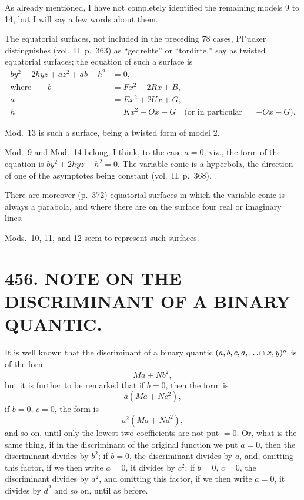 \documentclass[11pt,a4paper]{article}
\newcommand{\article}[2]{\section*{#1. #2}}
\begin{document}
As already mentioned, I have not completely identified the remaining models 9 to 14, but I will say a few words about them.

The equatorial surfaces, not included in the preceding 78 cases, Pl"{u}cker distinguishes (vol.~II. p.~363) as ``gedrehte'' or ``tordirte,'' say as twisted equatorial surfaces; the equation of such a surface is
\begin{align*}
by^{2} + 2hyz + az^{2} + ab - h^{2} &= 0,\\
\text{where}\qquad b &= F x^{2} - 2R x + B,\\
a &= Ex^{2} + 2Ux + G,\\
h &= Kx^{2} - Ox - G \quad \text{(or in particular } = -Ox - G\text{)}.
\end{align*}

Mod.~13 is such a surface, being a twisted form of model 2.

Mod.~9 and Mod.~14 belong, I think, to the case $a=0$; viz., the form of the equation is $by^{2} + 2hyz - h^{2} = 0$. The variable conic is a hyperbola, the direction of one of the asymptotes being constant (vol.~II. p.~368).

There are moreover (p.~372) equatorial surfaces in which the variable conic is always a parabola, and where there are on the surface four real or imaginary lines.

Mods.~10, 11, and 12 seem to represent such surfaces.

\newpage
\setcounter{page}{303}

\article{456}{NOTE ON THE DISCRIMINANT OF A BINARY QUANTIC.}


\vspace{0.5em}

It is well known that the discriminant of a binary quantic $(a,b,c,d,\ldots\hspace{-0.2em}\pitchfork x,y)^{n}$ is of the form
\[
Ma + Nb^{2},
\]
but it is further to be remarked that if $b=0$, then the form is
\[
a(Ma + Nc^{2}),
\]
if $b=0$, $c=0$, the form is
\[
a^{2}(Ma + Nd^{2}),
\]
and so on, until only the lowest two coefficients are not put $=0$. Or, what is the same thing, if in the discriminant of the original function we put $a=0$, then the discriminant divides by $b^{2}$; if $b=0$, the discriminant divides by $a$, and, omitting this factor, if we then write $a=0$, it divides by $c^{2}$; if $b=0$, $c=0$, the discriminant divides by $a^{2}$, and omitting this factor, if we then write $a=0$, it divides by $d^{2}$ and so on, until as before.
\end{document}
